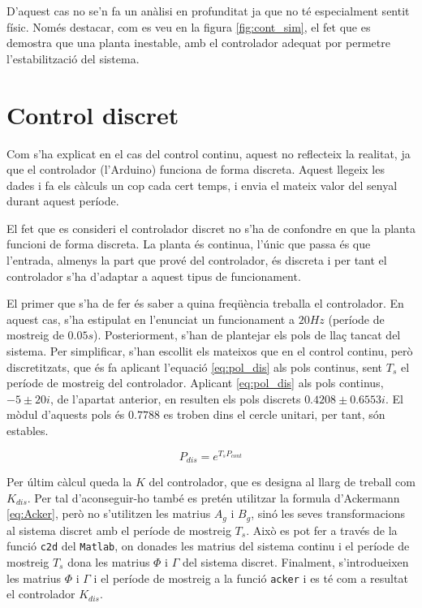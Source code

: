 \documentclass[12pt,a4paper,final,twoside,openright]{report}
\begin{document}
D'aquest cas no se'n fa un anàlisi en profunditat ja que no té especialment sentit físic. Només destacar, com es veu en la figura \ref{fig:cont_sim}, el fet que es demostra que una planta inestable, amb el controlador adequat por permetre l'estabilització del sistema.

\section{Control discret}

Com s'ha explicat en el cas del control continu, aquest no reflecteix la realitat, ja que el controlador (l'Arduino) funciona de forma discreta. Aquest llegeix les dades i fa els càlculs un cop cada cert temps, i envia el mateix valor del senyal durant aquest període.

El fet que es consideri el controlador discret no s'ha de confondre en que la planta funcioni de forma discreta. La planta és continua, l'únic que passa és que l'entrada, almenys la part que prové del controlador, és discreta i per tant el controlador s'ha d'adaptar a aquest tipus de funcionament. 

El primer que s'ha de fer és saber a quina freqüència treballa el controlador. En aquest cas, s'ha estipulat en l'enunciat un funcionament a $20 Hz$ (període de mostreig de $0.05 s$). Posteriorment, s'han de plantejar els pols de llaç tancat del sistema. Per simplificar, s'han escollit els mateixos que en el control continu, però discretitzats, que és fa aplicant l'equació \eqref{eq:pol_dis} als pols continus, sent $T_s$ el període de mostreig del controlador. Aplicant \eqref{eq:pol_dis} als pols continus, $-5\pm20i$, de l'apartat anterior, en resulten els pols discrets $0.4208\pm0.6553i$. El mòdul d'aquests pols és $0.7788$ es troben dins el cercle unitari, per tant, són estables. 

\begin{equation}\label{eq:pol_dis}
P_{dis} = e^{T_s P_{cont}}
\end{equation}


Per últim càlcul queda la $K$ del controlador, que es designa al llarg de treball com $K_{dis}$. Per tal d'aconseguir-ho també es pretén utilitzar la formula d'Ackermann \eqref{eq:Acker}, però no s'utilitzen les matrius $A_g$ i $B_g$, sinó les seves transformacions al sistema discret amb el període de mostreig $T_s$. Això es pot fer a través de la funció \texttt{c2d} del \texttt{Matlab}, on donades les matrius del sistema continu i el període de mostreig $T_s$ dona les matrius $\Phi$ i $\Gamma$ del sistema discret. Finalment, s'introdueixen les matrius $\Phi$ i $\Gamma$ i el període de mostreig a la funció \texttt{acker} i es té com a resultat el controlador $K_{dis}$.
\end{document}
